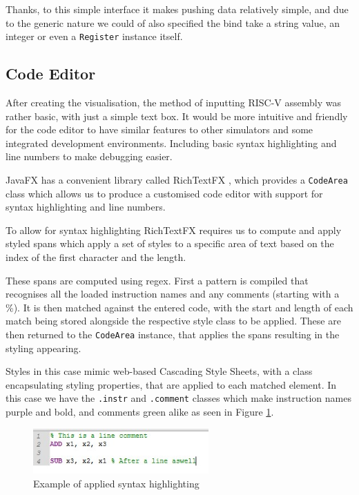 Thanks, to this simple interface it makes pushing data relatively simple, and due to the generic nature we could of also specified the bind take a string value, an integer or even a \texttt{Register} instance itself.

\subsection{Code Editor}
After creating the visualisation, the method of inputting RISC-V assembly was rather basic, with just a simple text box. It would be more intuitive and friendly for the code editor to have similar features to other simulators and some integrated development environments. Including basic syntax highlighting and line numbers to make debugging easier.

JavaFX \cite{sunmicrosystems_2022_javafx} has a convenient library called RichTextFX \cite{fxmisc_2023_fxmiscrichtextfx}, which provides a \texttt{CodeArea} class which allows us to produce a customised code editor with support for syntax highlighting and line numbers.

To allow for syntax highlighting RichTextFX \cite{fxmisc_2023_fxmiscrichtextfx} requires us to compute and apply styled spans which apply a set of styles to a specific area of text based on the index of the first character and the length.

These spans are computed using regex. First a pattern is compiled that recognises all the loaded instruction names and any comments (starting with a \%). It is then matched against the entered code, with the start and length of each match being stored alongside the respective style class to be applied. These are then returned to the \texttt{CodeArea} instance, that applies the spans resulting in the styling appearing.

Styles in this case mimic web-based Cascading Style Sheets, with a class encapsulating styling properties, that are applied to each matched element. In this case we have the \verb|.instr| and \verb|.comment| classes which make instruction names purple and bold, and comments green alike as seen in Figure \ref{fig:syntax_high}.

\begin{figure}
    \centering
    \includegraphics[width=0.6\textwidth]{dissertation/DATA/syntax_high.jpg}
    \caption{Example of applied syntax highlighting}
    \label{fig:syntax_high}
\end{figure}


